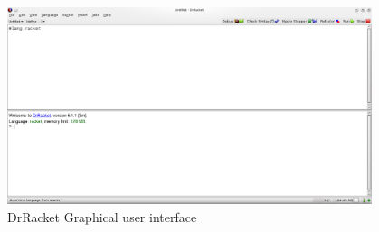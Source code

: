 \begin{figure}[htbp]
	\centering
	\includegraphics[width=0.95\textwidth]{img/DrRacketGui.png}
	\caption{DrRacket Graphical user interface}
	\label{fig:DrRacketGui}
\end{figure}




